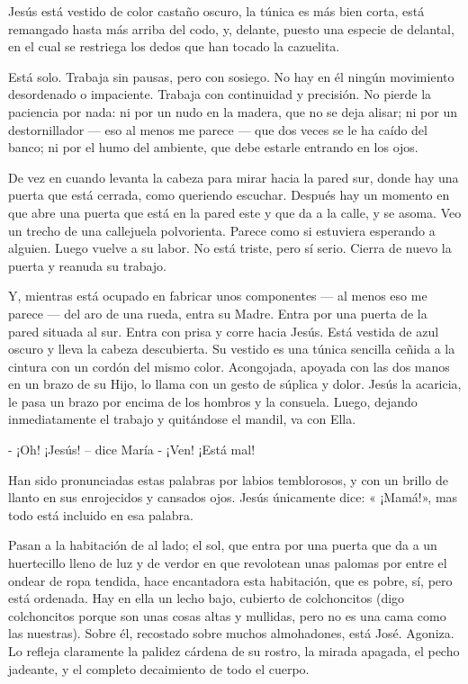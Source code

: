 \documentclass[12pt, twoside, openright]{book} %
\begin{document}
Jesús está vestido de color castaño oscuro, la túnica es más bien corta, está remangado hasta más arriba del codo, y, delante, puesto una especie de delantal, en el cual se restriega los dedos que han tocado la cazuelita. 

Está solo. Trabaja sin pausas, pero con sosiego. No hay en él ningún movimiento desordenado o impaciente. Trabaja con continuidad y precisión. No pierde la paciencia por nada: ni por un nudo en la madera, que no se deja alisar; ni por un destornillador — eso al menos me parece — que dos veces se le ha caído del banco; ni por el humo del ambiente, que debe estarle entrando en los ojos. 

De vez en cuando levanta la cabeza para mirar hacia la pared sur, donde hay una puerta que está cerrada, como queriendo escuchar. Después hay un momento en que abre una puerta que está en la pared este y que da a la calle, y se asoma. Veo un trecho de una callejuela polvorienta. Parece como si estuviera esperando a alguien. Luego vuelve a su labor. No está triste, pero sí serio. Cierra de nuevo la puerta y reanuda su trabajo. 

Y, mientras está ocupado en fabricar unos componentes — al menos eso me parece — del aro de una rueda, entra su Madre. Entra por una puerta de la pared situada al sur. Entra con prisa y corre hacia Jesús. Está vestida de azul oscuro y lleva la cabeza descubierta. Su vestido es una túnica sencilla ceñida a la cintura con un cordón del mismo color. Acongojada, apoyada con las dos manos en un brazo de su Hijo, lo llama con un gesto de súplica y dolor. Jesús la acaricia, le pasa un brazo por encima de los hombros y la consuela. Luego, dejando inmediatamente el trabajo y quitándose el mandil, va con Ella. 

- ¡Oh! ¡Jesús! – dice María - ¡Ven! ¡Está mal! 

Han sido pronunciadas estas palabras por labios temblorosos, y con un brillo de llanto en sus enrojecidos y cansados ojos. Jesús únicamente dice: « ¡Mamá!», mas todo está incluido en esa palabra. 

Pasan a la habitación de al lado; el sol, que entra por una puerta que da a un huertecillo lleno de luz y de verdor en que revolotean unas palomas por entre el ondear de ropa tendida, hace encantadora esta habitación, que es pobre, sí, pero está ordenada. Hay en ella un lecho bajo, cubierto de colchoncitos (digo colchoncitos porque son unas cosas altas y mullidas, pero no es una cama como las nuestras). Sobre él, recostado sobre muchos almohadones, está José. Agoniza. Lo refleja claramente la palidez cárdena de su rostro, la mirada apagada, el pecho jadeante, y el completo decaimiento de todo el cuerpo. 
\end{document}
